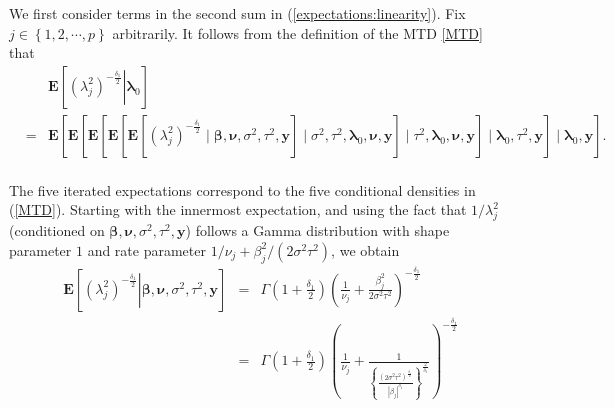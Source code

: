 \documentclass[noinfoline,11pt]{imsart}
\numberwithin{equation}{section}
\theoremstyle{plain}
\newcommand{\y}{\mathbf{y}}
\newcommand{\bl}{\boldsymbol{\lambda}}
\newcommand{\E}{\boldsymbol{E}}
\begin{document}
\noindent
We first consider terms in the second sum in (\ref{expectations:linearity}). Fix $j\in\left\{1,2,\cdots,p\right\}$ arbitrarily. It follows from the definition of the MTD \eqref{MTD} that 
\begin{eqnarray}
& & \E\left[\left.\left(\lambda_j^2\right)^{-\frac{\delta_1}{2}}\right|\mathbf{\bl}_0\right] \nonumber\\
&=& \E\left[\left.\E\left[\left.\E\left[\left.\E\left[\left.\E\left[\left.
\left(\lambda_j^2\right)^{-\frac{\delta_1}{2}}\right.\mid\boldsymbol{\beta,\nu},\sigma^2,\tau^2,\mathbf{\y}\right]\right.\mid\sigma^2,\tau^2,\mathbf{\bl}_0,{\boldsymbol \nu},\mathbf{\y}\right]\right.\mid\tau^2,\mathbf{\bl}_0,{\boldsymbol \nu},\mathbf{\y}\right]\right.\mid\bl_0,\tau^2,\y\right]\right.\mid\bl_0,\y\right]. \nonumber\\
& & \label{expectations:iterated}
\end{eqnarray}

\noindent
The five iterated expectations correspond to the five conditional densities in (\ref{MTD}). Starting with the innermost expectation, and using the fact that $1/\lambda_j^2$ (conditioned on $\boldsymbol{\beta,\nu},\sigma^2,\tau^2,\mathbf{\y}$) follows a Gamma distribution with shape parameter $1$ and rate parameter $1/\nu_j + \beta_j^2/(2 \sigma^2 \tau^2)$, we obtain 
\begin{eqnarray*}
    \E\left[\left.\left(\lambda_j^2\right)^{-\frac{\delta_1}{2}}\right|\boldsymbol{\beta,\nu},\sigma^2,\tau^2,\mathbf{\y}\right]&=& \Gamma\left(1+\frac{\delta_1}{2}\right)\left(\frac{1}{\nu_j}+\frac{\beta_j^2}{2\sigma^2\tau^2}\right)^{-\frac{\delta_1}{2}} \\
    &=& \Gamma\left(1+\frac{\delta_1}{2}\right)\left(\frac{1}{\nu_j}+\frac{1}{\left\{\frac{\left(2\sigma^2\tau^2\right)^{\frac{\delta_1}{2}}}{\left|\beta_j\right|^{\delta_1}}\right\}^{\frac{2}{\delta_1}}}\right)^{-\frac{\delta_1}{2}} \\
\end{eqnarray*}
\end{document}
